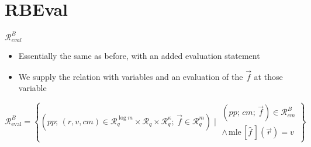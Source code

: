 \section{RBEval}
\begin{frame}{$\mathcal{R}^B_{eval}$}
    \begin{itemize}
        \item Essentially the same as before, with an added evaluation statement
        \item We supply the relation with variables and an evaluation of the $\overrightarrow{f}$ at those variable
    \end{itemize}
    \[
        \mathcal{R}^B_{\text{eval}} =
        \left\{ (pp; \, (r,v,cm) \in \mathcal{R}^{\log m}_q \times \mathcal{R}_q \times \mathcal{R}^{\kappa}_q; \, \overrightarrow{f} \in \mathcal{R}^m_q) \mid
        \begin{array}{c}
            (pp; \, cm; \, \overrightarrow{f}) \in \mathcal{R}^B_{cm} \\
            \land \, \text{mle}\,[\hat{f}\,](\overrightarrow{r}) = v
        \end{array}
        \right\}
    \]
\end{frame}